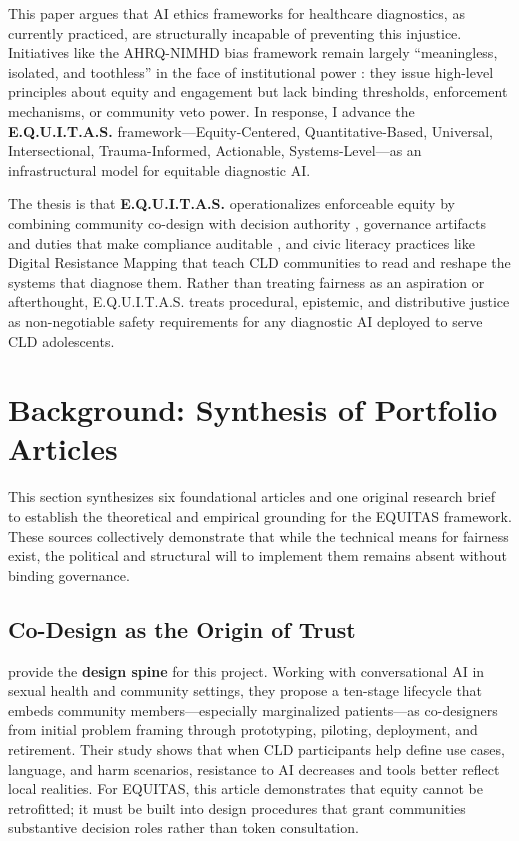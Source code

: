 \documentclass[12pt, letterpaper]{article}
\begin{document}
This paper argues that AI ethics frameworks for healthcare diagnostics, as currently practiced, are structurally incapable of preventing this injustice. Initiatives like the AHRQ-NIMHD bias framework remain largely ``meaningless, isolated, and toothless'' in the face of institutional power \citep{munn2022}: they issue high-level principles about equity and engagement but lack binding thresholds, enforcement mechanisms, or community veto power. In response, I advance the \textbf{E.Q.U.I.T.A.S.} framework—Equity-Centered, Quantitative-Based, Universal, Intersectional, Trauma-Informed, Actionable, Systems-Level—as an infrastructural model for equitable diagnostic AI.

The thesis is that \textbf{E.Q.U.I.T.A.S.} operationalizes enforceable equity by combining community co-design with decision authority \citep{nadarzynski2024}, governance artifacts and duties that make compliance auditable \citep{lekadir2025}, and civic literacy practices like Digital Resistance Mapping that teach CLD communities to read and reshape the systems that diagnose them. Rather than treating fairness as an aspiration or afterthought, E.Q.U.I.T.A.S. treats procedural, epistemic, and distributive justice as non-negotiable safety requirements for any diagnostic AI deployed to serve CLD adolescents.

\section{Background: Synthesis of Portfolio Articles}

This section synthesizes six foundational articles and one original research brief to establish the theoretical and empirical grounding for the EQUITAS framework. These sources collectively demonstrate that while the technical means for fairness exist, the political and structural will to implement them remains absent without binding governance.

\subsection{Co-Design as the Origin of Trust}
\cite{nadarzynski2024} provide the \textbf{design spine} for this project. Working with conversational AI in sexual health and community settings, they propose a ten-stage lifecycle that embeds community members—especially marginalized patients—as co-designers from initial problem framing through prototyping, piloting, deployment, and retirement. Their study shows that when CLD participants help define use cases, language, and harm scenarios, resistance to AI decreases and tools better reflect local realities. For EQUITAS, this article demonstrates that equity cannot be retrofitted; it must be built into design procedures that grant communities substantive decision roles rather than token consultation.
\end{document}
